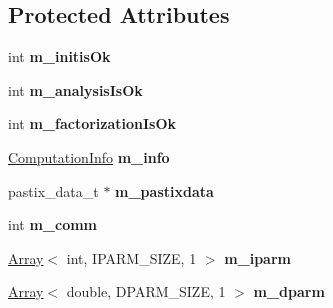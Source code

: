 \subsection*{Protected Attributes}
\begin{DoxyCompactItemize}
\item 
\mbox{\label{class_eigen_1_1_pastix_base_aaec1e805c8ea06e946a04e3bd4cd13fe}} 
int {\bfseries m\+\_\+initis\+Ok}
\item 
\mbox{\label{class_eigen_1_1_pastix_base_a9bf581a78008c1b10784ce12ef9f4d24}} 
int {\bfseries m\+\_\+analysis\+Is\+Ok}
\item 
\mbox{\label{class_eigen_1_1_pastix_base_a238a5fcf1f5ddde5e8996b8d971e3882}} 
int {\bfseries m\+\_\+factorization\+Is\+Ok}
\item 
\mbox{\label{class_eigen_1_1_pastix_base_ae37b176f45ed1f4145c19a6bd1742863}} 
\mbox{\hyperlink{group__enums_ga85fad7b87587764e5cf6b513a9e0ee5e}{Computation\+Info}} {\bfseries m\+\_\+info}
\item 
\mbox{\label{class_eigen_1_1_pastix_base_adcd075ee3317f41566c60dfcc402e2fb}} 
pastix\+\_\+data\+\_\+t $\ast$ {\bfseries m\+\_\+pastixdata}
\item 
\mbox{\label{class_eigen_1_1_pastix_base_af081942a2221ed4a4996b702613a4c4f}} 
int {\bfseries m\+\_\+comm}
\item 
\mbox{\label{class_eigen_1_1_pastix_base_a5cdb7299e33d7f089d9e38f191aed9b9}} 
\mbox{\hyperlink{class_eigen_1_1_array}{Array}}$<$ int, I\+P\+A\+R\+M\+\_\+\+S\+I\+ZE, 1 $>$ {\bfseries m\+\_\+iparm}
\item 
\mbox{\label{class_eigen_1_1_pastix_base_a139ba50ba94931769c328fa7c373a180}} 
\mbox{\hyperlink{class_eigen_1_1_array}{Array}}$<$ double, D\+P\+A\+R\+M\+\_\+\+S\+I\+ZE, 1 $>$ {\bfseries m\+\_\+dparm}
\item 
\mbox{\label{class_eigen_1_1_pastix_base_a38aac82eb011ec6a7cfe01ce64287a82}} 

\end{DoxyCompactItemize}
